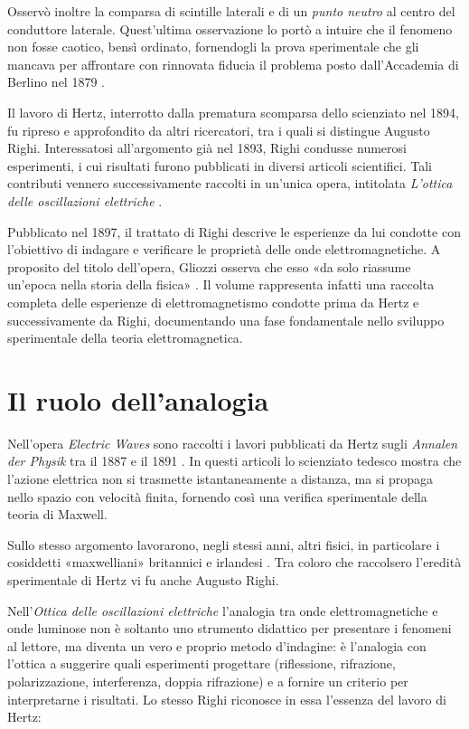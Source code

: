 Osservò inoltre la comparsa di scintille laterali e di un \emph{punto neutro}
al centro del conduttore laterale. Quest'ultima osservazione lo portò a
intuire che il fenomeno non fosse caotico, bensì ordinato, fornendogli la
prova sperimentale che gli mancava per affrontare con rinnovata fiducia il
problema posto dall'Accademia di Berlino nel 1879 \cite[p.~2]{hertz1893electric}.

Il lavoro di Hertz, interrotto dalla prematura scomparsa dello scienziato
nel 1894, fu ripreso e approfondito da altri ricercatori, tra i quali si
distingue Augusto Righi. Interessatosi all'argomento già nel 1893, Righi
condusse numerosi esperimenti, i cui risultati furono pubblicati in diversi
articoli scientifici. Tali contributi vennero successivamente raccolti in un'unica opera,
intitolata \textit{L'ottica delle oscillazioni elettriche} \cite[p.~183]{gliozzi2022twocenturies}.

Pubblicato nel 1897, il trattato di Righi descrive le esperienze da lui condotte con l'obiettivo di indagare e verificare le
proprietà delle onde elettromagnetiche. A proposito del titolo dell'opera, Gliozzi osserva che esso «da solo riassume un'epoca nella storia della fisica»
\cite[p.~183]{gliozzi2022twocenturies}. Il volume rappresenta infatti una raccolta completa delle esperienze di elettromagnetismo condotte prima
da Hertz e successivamente da Righi, documentando una fase fondamentale nello sviluppo sperimentale della teoria elettromagnetica.


\section{Il ruolo dell'analogia}

Nell'opera \textit{Electric Waves} sono raccolti i lavori pubblicati da Hertz sugli \textit{Annalen der Physik} tra il 1887 e il 1891
\cite{hertz1893electric}. In questi articoli lo scienziato tedesco mostra che l'azione elettrica non si trasmette istantaneamente a distanza, ma si propaga nello
spazio con velocità finita, fornendo così una verifica sperimentale della teoria di Maxwell.

Sullo stesso argomento lavorarono, negli stessi anni, altri fisici, in particolare i cosiddetti «maxwelliani»
britannici e irlandesi \cite{ohara1987hertz}. Tra coloro che raccolsero l'eredità sperimentale di Hertz vi fu anche Augusto Righi.

Nell'\textit{Ottica delle oscillazioni elettriche} l'analogia tra onde elettromagnetiche e onde luminose
non è soltanto uno strumento didattico per presentare i fenomeni al lettore, ma diventa un vero e proprio metodo d'indagine:
è l'analogia con l'ottica a suggerire quali esperimenti progettare (riflessione, rifrazione, polarizzazione, interferenza,
doppia rifrazione) e a fornire un criterio per interpretarne i risultati.
Lo stesso Righi riconosce in essa l'essenza del lavoro di Hertz:

